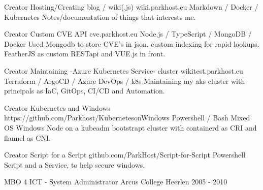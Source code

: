 \documentclass[11pt, letterpaper]{awesome-cv}
\begin{document}
\begin{cventries}

  \cventry
    {Creator}
    {Hosting/Creating blog / wiki(.js)}
    {wiki.parkhost.eu}
    {Markdown / Docker / Kubernetes}
    {Notes/documentation of things that interests me.}

  \cventry
    {Creator}
    {Custom CVE API}
    {cve.parkhost.eu}
    {Node.js / TypeScript / MongoDB / Docker}
    {Used Mongodb to store CVE's in json, custom indexing for rapid lookups. FeatherJS as custom RESTapi and VUE.js in front.}

  \cventry
    {Creator}
    {Maintaining -Azure Kubernetes Service- cluster}
    {wikitest.parkhost.eu}
    {Terraform / ArgoCD / Azure DevOps / k8s}
    {Maintaining my aks cluster with principals as IaC, GitOps, CI/CD and Automation.}

  \cventry
    {Creator}
    {Kubernetes and Windows}
    {https://github.com/Parkhost/KubernetesonWindows}
    {Powershell / Bash}
    {Mixed OS Windows Node on a kubeadm bootstrapt cluster with containerd as CRI and flannel as CNI.}

  \cventry
    {Creator}
    {Script for a Script}
    {github.com/ParkHost/Script-for-Script}
    {Powershell}
    {Script and a Service, to help secure windows.}


\end{cventries}

\begin{cventries}

  \cventry
    {MBO 4 ICT - System Administrator}
    {Arcus College}
    {Heerlen}
    {2005 - 2010}
    {
    }


\end{cventries}

\end{document}
